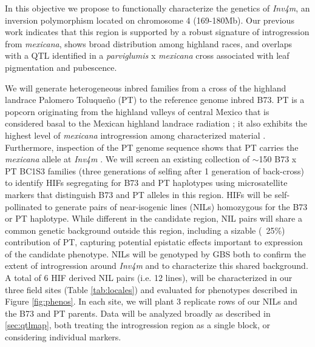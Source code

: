In this objective we propose to functionally characterize the genetics of \emph{Inv4m}, an inversion polymorphism located on chromosome 4 (169-180Mb). Our previous work \citep{Hufford2013, Pyhajarvi2013} indicates that this region is supported by a robust signature of introgression from \emph{mexicana}, shows broad distribution among highland races, and overlaps with a QTL identified in a \emph{parviglumis} x \emph{mexicana} cross  \citep{Lauter2004a} associated with leaf pigmentation and pubescence. %


We will generate heterogeneous inbred families \citep[HIFs;][]{tuinstra1997heterogeneous} from a cross of the highland landrace Palomero Toluque\~no (PT) to the reference genome inbred B73.  PT is a popcorn originating from the highland valleys of central Mexico that is considered basal to the Mexican highland landrace radiation \citep{reif2006grouping}; it also exhibits the highest level of \emph{mexicana} introgression among characterized material \citep{Matsuoka2002}. Furthermore, inspection of the PT genome sequence \citep{Vielle-Calzada2009} shows that PT carries the \emph{mexicana} allele at \emph{Inv4m} \citep{Hufford2013}. We will screen an existing collection of $\sim$150 B73 x PT BC1S3 families (three generations of selfing after 1 generation of back-cross)  to identify HIFs segregating for B73 and PT haplotypes using microsatellite markers that distinguish B73 and PT alleles in this region. HIFs will be self-pollinated to generate pairs of near-isogenic lines (NILs) homozygous for the B73 or PT haplotype. While different in the candidate region, NIL pairs will share a common genetic background outside this region, including a sizable (~25\%) contribution of PT, capturing potential epistatic effects important to expression of the candidate phenotype. NILs will be genotyped by GBS  both to confirm the extent of introgression around \emph{Inv4m} and to characterize this shared background. A total of 6 HIF derived NIL pairs (i.e. 12 lines), will be characterized in our three field sites (Table \ref{tab:locales}) and evaluated for phenotypes described in Figure \ref{fig:phenos}. In each site, we will plant 3 replicate rows of our NILs and the B73 and PT parents. Data will be analyzed broadly as described in \ref{sec:qtlmap}, both treating the introgression region as a single block, or considering individual markers.

